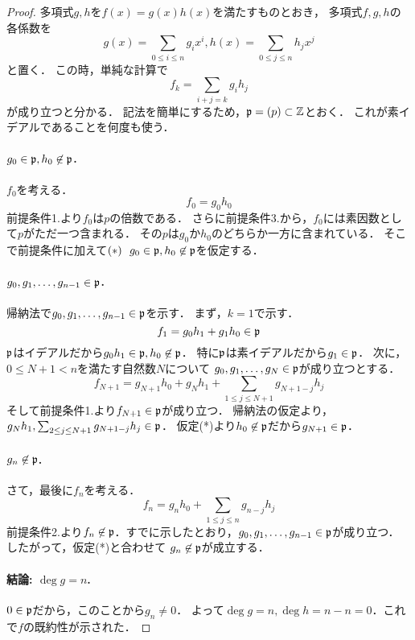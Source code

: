 \documentclass[a4j]{jsarticle}
\begin{document}
\begin{proof}
    多項式$g,h$を$f(x)=g(x) h(x)$を満たすものとおき，
    多項式$f, g, h$の各係数を
    \[ g(x)=\sum_{0 \leq i \leq n}{g_i x^i}, h(x)=\sum_{0 \leq j \leq n}{h_j x^j} \]
    と置く．
    この時，単純な計算で
    \[ f_{k}=\sum_{i+j=k}{g_i h_j} \]
    が成り立つと分かる．
    記法を簡単にするため，$\mathfrak{p}=(p) \subset \mathbb{Z}$とおく．
    これが素イデアルであることを何度も使う．

    \paragraph{$g_0 \in \mathfrak{p}, h_0 \not \in \mathfrak{p}$.}
    $f_0$を考える．
    \[ f_0=g_0 h_0 \]
    前提条件1.より$f_0$は$p$の倍数である．
    さらに前提条件3.から，$f_0$には素因数として$p$がただ一つ含まれる．
    その$p$は$g_0$か$h_0$のどちらか一方に含まれている．
    そこで前提条件に加えて$(*)~~g_0 \in \mathfrak{p}, h_0 \not \in \mathfrak{p}$を仮定する．

    \paragraph{$g_0, g_1, \dots, g_{n-1} \in \mathfrak{p}$.}
    帰納法で$g_0, g_1, \dots, g_{n-1} \in \mathfrak{p}$を示す．
    まず，$k=1$で示す．
    \[ f_1=g_0 h_1 + g_1 h_0 \in \mathfrak{p} \]
    $\mathfrak{p}$はイデアルだから$g_0 h_1 \in \mathfrak{p}, h_0 \not \in \mathfrak{p}$．
    特に$\mathfrak{p}$は素イデアルだから$g_1 \in \mathfrak{p}$．
    次に，$0 \leq N+1 < n$を満たす自然数$N$について
    $g_0, g_1, \dots, g_{N} \in \mathfrak{p}$が成り立つとする．
    \[ f_{N+1}=g_{N+1} h_0+g_{N} h_1+\sum_{1 \leq j \leq N+1}{g_{N+1-j} h_j } \]
    そして前提条件1.より$f_{N+1} \in \mathfrak{p}$が成り立つ．
    帰納法の仮定より，$g_{N} h_1, \sum_{2 \leq j \leq N+1}{g_{N+1-j} h_j } \in \mathfrak{p}$．
    仮定(*)より$h_0 \not \in \mathfrak{p}$だから$g_{N+1} \in \mathfrak{p}$．

    \paragraph{$g_n \not \in \mathfrak{p}$.}
    さて，最後に$f_n$を考える．
    \[ f_{n}=g_{n} h_0+\sum_{1 \leq j \leq n}{g_{n-j} h_j } \]
    前提条件2.より$f_{n} \not \in \mathfrak{p}$．すでに示したとおり，$g_0, g_1, \dots, g_{n-1} \in \mathfrak{p}$が成り立つ．
    したがって，仮定(*)と合わせて
    $g_n \not \in \mathfrak{p}$が成立する．

    \paragraph{結論: $\deg g=n$.}
    $0 \in \mathfrak{p}$だから，このことから$g_n \neq 0$．
    よって$\deg g=n, \deg h=n-n=0$．これで$f$の既約性が示された．
\end{proof}
\end{document}
